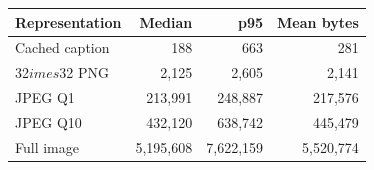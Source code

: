\begin{tabular}{lrrr}
\toprule
Representation & Median & p95 & Mean bytes \\
\midrule
Cached caption & 188 & 663 & 281 \\
32$	imes$32 PNG & 2,125 & 2,605 & 2,141 \\
JPEG Q1 & 213,991 & 248,887 & 217,576 \\
JPEG Q10 & 432,120 & 638,742 & 445,479 \\
Full image & 5,195,608 & 7,622,159 & 5,520,774 \\
\bottomrule
\end{tabular}
